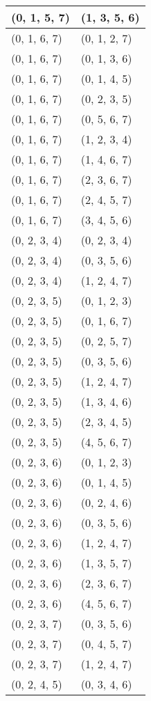 \begin{footnotesize}
\begin{longtable}[c]{|l|l|}
(0, 1, 5, 7)
&(1, 3, 5, 6)
\\ \hline
(0, 1, 6, 7)
&(0, 1, 2, 7)
\\ \hline
(0, 1, 6, 7)
&(0, 1, 3, 6)
\\ \hline
(0, 1, 6, 7)
&(0, 1, 4, 5)
\\ \hline
(0, 1, 6, 7)
&(0, 2, 3, 5)
\\ \hline
(0, 1, 6, 7)
&(0, 5, 6, 7)
\\ \hline
(0, 1, 6, 7)
&(1, 2, 3, 4)
\\ \hline
(0, 1, 6, 7)
&(1, 4, 6, 7)
\\ \hline
(0, 1, 6, 7)
&(2, 3, 6, 7)
\\ \hline
(0, 1, 6, 7)
&(2, 4, 5, 7)
\\ \hline
(0, 1, 6, 7)
&(3, 4, 5, 6)
\\ \hline
(0, 2, 3, 4)
&(0, 2, 3, 4)
\\ \hline
(0, 2, 3, 4)
&(0, 3, 5, 6)
\\ \hline
(0, 2, 3, 4)
&(1, 2, 4, 7)
\\ \hline
(0, 2, 3, 5)
&(0, 1, 2, 3)
\\ \hline
(0, 2, 3, 5)
&(0, 1, 6, 7)
\\ \hline
(0, 2, 3, 5)
&(0, 2, 5, 7)
\\ \hline
(0, 2, 3, 5)
&(0, 3, 5, 6)
\\ \hline
(0, 2, 3, 5)
&(1, 2, 4, 7)
\\ \hline
(0, 2, 3, 5)
&(1, 3, 4, 6)
\\ \hline
(0, 2, 3, 5)
&(2, 3, 4, 5)
\\ \hline
(0, 2, 3, 5)
&(4, 5, 6, 7)
\\ \hline
(0, 2, 3, 6)
&(0, 1, 2, 3)
\\ \hline
(0, 2, 3, 6)
&(0, 1, 4, 5)
\\ \hline
(0, 2, 3, 6)
&(0, 2, 4, 6)
\\ \hline
(0, 2, 3, 6)
&(0, 3, 5, 6)
\\ \hline
(0, 2, 3, 6)
&(1, 2, 4, 7)
\\ \hline
(0, 2, 3, 6)
&(1, 3, 5, 7)
\\ \hline
(0, 2, 3, 6)
&(2, 3, 6, 7)
\\ \hline
(0, 2, 3, 6)
&(4, 5, 6, 7)
\\ \hline
(0, 2, 3, 7)
&(0, 3, 5, 6)
\\ \hline
(0, 2, 3, 7)
&(0, 4, 5, 7)
\\ \hline
(0, 2, 3, 7)
&(1, 2, 4, 7)
\\ \hline
(0, 2, 4, 5)
&(0, 3, 4, 6)
\\ \hline

\end{longtable}
\end{footnotesize}
